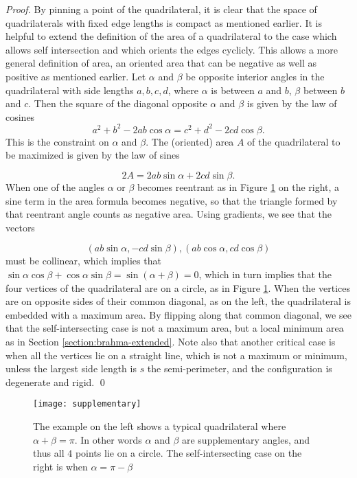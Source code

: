 \documentclass[11pt]{article}
\numberwithin{equation}{section}
\numberwithin{figure}{section}
\begin{document}
\begin{proof} By pinning a point of the quadrilateral, it is clear that the space of  quadrilaterals with fixed edge lengths is compact  as mentioned earlier.  It is helpful to extend the definition of the area of a quadrilateral to the case which allows self intersection and which orients the edges cyclicly.   This allows a more general definition of area, an oriented area that can be negative as well as positive as mentioned earlier.  Let $\alpha$ and $\beta$ be opposite interior angles in the quadrilateral with side lengths $a, b, c, d$, where $\alpha$ is between $a$ and $b$, $\beta$ between $b$ and $c$.  Then the square of the diagonal opposite $\alpha$ and $\beta$ is given by the law of cosines 
\[a^2 +b^2 -2ab\cos \alpha= c^2+d^2 -2cd \cos \beta.\]
This is the constraint on $\alpha$ and $\beta$. The (oriented) area $A$ of the quadrilateral to be maximized is given by the law of sines

\[2A=2ab \sin\alpha +  2cd \sin \beta. \]
When one of the angles $\alpha$ or $\beta$ becomes reentrant as in Figure \ref{fig:supplementary} on the right, a sine term in the area formula becomes negative, so that the triangle formed by that reentrant angle counts as negative area.  Using gradients, we see that the vectors 

\[( ab\sin \alpha, -cd \sin\beta), (ab \cos \alpha, cd \cos \beta)\]
must be collinear, which implies that $\sin \alpha \cos \beta +\cos \alpha \sin \beta = \sin (\alpha +\beta) = 0$, which in turn implies that the four vertices of the quadrilateral are on a circle, as in Figure \ref{fig:supplementary}. 
When the vertices are on opposite sides of their common diagonal, as on the left, the quadrilateral is embedded with a maximum area.   By flipping along that common diagonal, we see that the self-intersecting case is not a maximum area, but a local minimum area as in Section \ref{section:brahma-extended}.  Note also that another critical case is when all the vertices lie on a straight line, which is not a maximum or minimum, unless  the largest side length is $s$ the semi-perimeter, and the configuration is degenerate and rigid. \qed  
\end{proof}

 \begin{figure}[!htb]
    \centering
        \texttt{[image: supplementary]}%
        \captionsetup{labelsep=colon,margin=2cm}
         \caption{The example on the left shows a typical quadrilateral where $\alpha + \beta=\pi$.  In other words $\alpha$ and $\beta$ are supplementary angles, and thus all $4$ points lie on a circle. The self-intersecting case on the right is when $\alpha =\pi -\beta$}\label{fig:supplementary}
    \end{figure}
    
\end{document}

